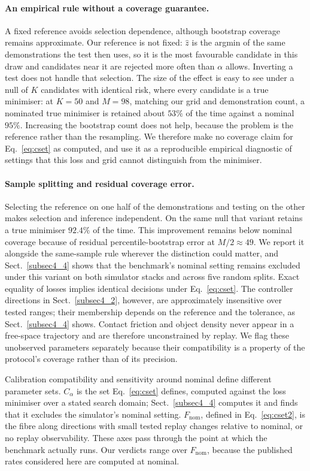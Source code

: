 \documentclass[pdflatex,iicol,sn-apa]{sn-jnl}
\theoremstyle{remark}
\begin{document}
\paragraph{An empirical rule without a coverage guarantee.}
A fixed reference avoids selection dependence, although bootstrap coverage remains approximate.
Our reference is not fixed: $\hat z$ is the argmin of
the same demonstrations the test then uses, so it is the most favourable candidate in this draw and
candidates near it are rejected more often than $\alpha$ allows. Inverting a test does not handle
that selection. The size of the effect is easy to see under a null of $K$ candidates with identical
risk, where every candidate is a true minimiser: at $K = 50$ and $M = 98$, matching our grid and
demonstration count, a nominated true minimiser is retained about $53\%$ of the time against a
nominal $95\%$. Increasing the bootstrap count does not
help, because the problem is the reference rather than the resampling. We therefore make no
coverage claim for Eq.~\eqref{eq:cset} as computed, and use it as a reproducible empirical diagnostic of settings that this loss and grid
cannot distinguish from the minimiser.

\paragraph{Sample splitting and residual coverage error.} Selecting the reference on one half
of the demonstrations and testing on the other makes selection and inference independent. On the
same null that variant retains a true minimiser $92.4\%$ of the time. This improvement remains below nominal coverage because of residual percentile-bootstrap
error at $M/2 \approx 49$. We report it alongside the
same-sample rule wherever the distinction could matter, and Sect.~\ref{subsec4_4} shows that the
benchmark's nominal setting remains excluded under
this variant on both simulator stacks and across five random splits. Exact equality of losses implies
identical decisions under Eq.~\eqref{eq:cset}. The controller directions in Sect.~\ref{subsec4_2},
however, are approximately insensitive over tested ranges; their membership depends on the reference
and the tolerance, as Sect.~\ref{subsec4_4} shows. Contact friction and object density never appear
in a free-space trajectory and are therefore unconstrained by replay. We flag these unobserved
parameters separately because their compatibility is a property of the protocol's coverage
rather than of its precision.

Calibration compatibility and sensitivity around nominal define different parameter sets.
$C_\alpha$ is the set Eq.~\eqref{eq:cset} defines, computed against the loss minimiser over a stated
search domain; Sect.~\ref{subsec4_4} computes it and finds that it excludes the simulator's
nominal setting. $F_{\mathrm{nom}}$, defined in Eq.~\eqref{eq:cset2}, is the fibre along directions
with small tested replay changes relative to nominal, or no replay observability. These axes pass through the point
at which the benchmark actually runs. Our verdicts range over $F_{\mathrm{nom}}$, because the published rates considered here are computed at nominal.
\end{document}
